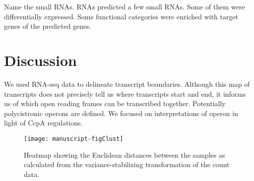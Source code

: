 \documentclass{article}
\begin{document}
Name the small RNAs.
RNAz predicted a few small RNAs. Some of them were differentially expressed.
Some functional categories were enriched with target genes of the predicted
genes. 

\section{Discussion}
We used RNA-seq data to delineate transcript boundaries. Although this map of
transcripts does not precisely tell us where transcripts start and end, it
informs us of which open reading frames can be transcribed together. Potentially
polycistronic operons are defined. We focused on interpretations of operon in
light of CcpA regulations. 


\renewcommand*{\refname}{Literature Cited}





\begin{figure}
\centering
\texttt{[image: manuscript-figClust]}
\caption{Heatmap showing the Euclidean distances between the samples
  as calculated from the variance-stabilizing transformation of the
  count data.}
\label{figClust}
\end{figure}
\end{document}
